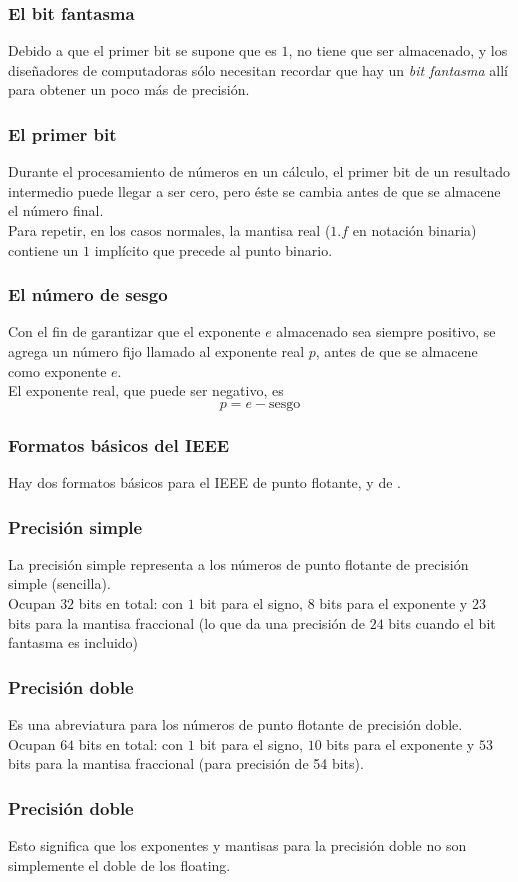 \begin{frame}
\frametitle{El bit fantasma}
Debido a que el primer bit se supone que es $1$, no tiene que ser almacenado, y los diseñadores de computadoras sólo necesitan recordar que hay un \emph{bit fantasma} allí para obtener un poco más de precisión.
\end{frame}
\begin{frame}
\frametitle{El primer bit}
Durante el procesamiento de números en un cálculo, el primer bit de un resultado intermedio puede llegar a ser cero, pero éste se cambia antes de que se almacene el número final.
\\
\bigskip
Para repetir, en los casos normales, la mantisa real ($1.f$ en notación binaria) contiene un $1$ implícito que precede al punto binario.
\end{frame}
\begin{frame}
\frametitle{El número de sesgo}
Con el fin de garantizar que el exponente $e$ almacenado sea siempre positivo, se agrega un número fijo llamado  al exponente real $p$, antes de que se almacene como exponente $e$.
\\
\bigskip
El exponente real, que puede ser negativo, es
\begin{equation}
p = e - \text{sesgo}
\label{eq:ecuacion_01_03}
\end{equation}
\end{frame}
\begin{frame}
\frametitle{Formatos básicos del IEEE}
Hay dos formatos básicos para el IEEE de punto flotante,  y de .
\end{frame}
\begin{frame}
\frametitle{Precisión simple}
La precisión simple representa a los números de punto flotante de precisión simple (sencilla).
\\
\bigskip
Ocupan $32$ bits en total: con $1$ bit para el signo, $8$ bits para el exponente y $23$ bits para la mantisa fraccional (lo que da una precisión de $24$ bits cuando el bit fantasma es incluido)
\end{frame}
\begin{frame}
\frametitle{Precisión doble}
Es una abreviatura para los números de punto flotante de precisión doble.
\\
\bigskip
Ocupan $64$ bits en total: con $1$ bit para el signo, $10$ bits para el exponente y $53$ bits para la mantisa fraccional (para precisión de 54 bits).
\end{frame}
\begin{frame}
\frametitle{Precisión doble}
Esto significa que los exponentes y mantisas para la precisión doble no son simplemente el doble de los floating.
\end{frame}
